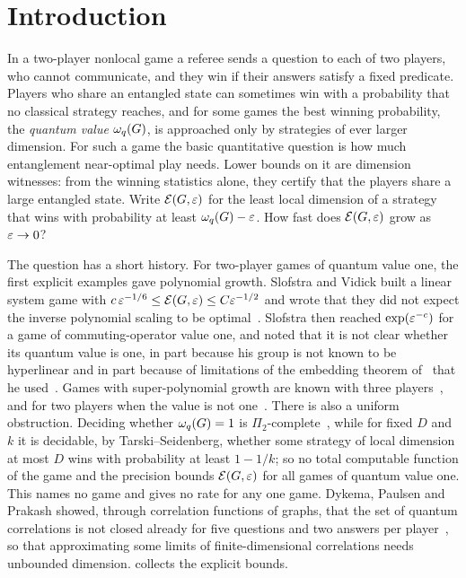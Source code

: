 \section{Introduction}\label{sec:intro}

In a two-player nonlocal game a referee sends a question to each of two players, who cannot communicate, and they win if their answers
satisfy a fixed predicate. Players who share an entangled state can sometimes win with a probability that no classical strategy reaches,
and for some games the best winning probability, the \emph{quantum value} $\omega_{q}(G)$, is approached only by strategies of ever larger
dimension. For such a game the basic quantitative question is how much entanglement near-optimal play needs. Lower bounds on it are
dimension witnesses: from the winning statistics alone, they certify that the players share a large entangled state. Write $\mathcal E(G,\varepsilon)$
for the least local dimension of a strategy that wins with probability at least $\omega_{q}(G)-\varepsilon$. How fast does $\mathcal E(G,\varepsilon)$ grow as $\varepsilon\to0$?

The question has a short history. For two-player games of quantum value one, the first explicit examples gave polynomial growth.
Slofstra and Vidick built a linear system game with $c\,\varepsilon^{-1/6}\le\mathcal E(G,\varepsilon)\le C\varepsilon^{-1/2}$ and wrote that they did not expect the
inverse polynomial scaling to be optimal~\cite{SV18}. Slofstra then reached $\exp(\varepsilon^{-c})$ for a game of commuting-operator value
one, and noted that it is not clear whether its quantum value is one, in part because his group is not known to be hyperlinear and in
part because of limitations of the embedding theorem of~\cite{Slo20} that he used~\cite{Slo18}. Games with super-polynomial growth
are known with three players~\cite{JLV20}, and for two players when the value is not one~\cite{Col20}. There is also a uniform obstruction.
Deciding whether $\omega_{q}(G)=1$ is $\Pi_2$-complete~\cite[Thm.~1.1]{MNY22}, while for fixed $D$ and $k$ it is decidable, by
Tarski--Seidenberg, whether some strategy of local dimension at most $D$ wins with probability at least $1-1/k$; so no total computable
function of the game and the precision bounds $\mathcal E(G,\varepsilon)$ for all games of quantum value one. This names no game and gives no rate
for any one game. Dykema, Paulsen and Prakash showed, through correlation functions of graphs, that
the set of quantum correlations is not closed already for five questions and two answers per player~\cite{DPP19}, so that approximating
some limits of finite-dimensional correlations needs unbounded dimension. 
collects the explicit bounds.

